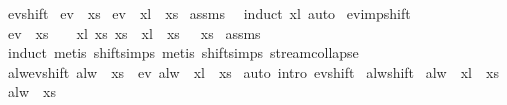 \begin{isabellebody}
\isanewline
{}\isamarkupfalse%
\ ev{\isacharunderscore}shift{\isacharcolon}\isanewline
{}\ {\isachardoublequoteopen}ev\ {\isasymphi}\ xs{\isachardoublequoteclose}\isanewline
{}\ {\isachardoublequoteopen}ev\ {\isasymphi}\ {\isacharparenleft}xl\ {\isacharat}{\isacharminus}\ xs{\isacharparenright}{\isachardoublequoteclose}\isanewline
%
\isadelimproof
%
\endisadelimproof
%
\isatagproof
{}\isamarkupfalse%
\ assms\ \isamarkupfalse%
\ {\isacharparenleft}induct\ xl{\isacharparenright}\ auto%
\endisatagproof
{\isafoldproof}%
%
\isadelimproof
\isanewline
%
\endisadelimproof
\isanewline
{}\isamarkupfalse%
\ ev{\isacharunderscore}imp{\isacharunderscore}shift{\isacharcolon}\isanewline
{}\ {\isachardoublequoteopen}ev\ {\isasymphi}\ xs{\isachardoublequoteclose}\ \ \ {\isachardoublequoteopen}{\isasymexists}\ xl\ xs{}{\isachardot}\ xs\ {\isacharequal}\ xl\ {\isacharat}{\isacharminus}\ xs{}\ {\isasymand}\ {\isasymphi}\ xs{}{\isachardoublequoteclose}\isanewline
%
\isadelimproof
%
\endisadelimproof
%
\isatagproof
{}\isamarkupfalse%
\ assms\ \isamarkupfalse%
\ induct\ {\isacharparenleft}metis\ shift{\isachardot}simps{\isacharparenleft}{}{\isacharparenright}{\isacharcomma}\ metis\ shift{\isachardot}simps{\isacharparenleft}{}{\isacharparenright}\ stream{\isachardot}collapse{\isacharparenright}{\isacharplus}%
\endisatagproof
{\isafoldproof}%
%
\isadelimproof
\isanewline
%
\endisadelimproof
\isanewline
{}\isamarkupfalse%
\ alw{\isacharunderscore}ev{\isacharunderscore}shift{\isacharcolon}\ {\isachardoublequoteopen}alw\ {\isasymphi}\ xs{}\ {\isasymLongrightarrow}\ ev\ {\isacharparenleft}alw\ {\isasymphi}{\isacharparenright}\ {\isacharparenleft}xl\ {\isacharat}{\isacharminus}\ xs{}{\isacharparenright}{\isachardoublequoteclose}\isanewline
%
\isadelimproof
%
\endisadelimproof
%
\isatagproof
{}\isamarkupfalse%
\ {\isacharparenleft}auto\ intro{\isacharcolon}\ ev{\isacharunderscore}shift{\isacharparenright}%
\endisatagproof
{\isafoldproof}%
%
\isadelimproof
\isanewline
%
\endisadelimproof
\isanewline
{}\isamarkupfalse%
\ alw{\isacharunderscore}shift{\isacharcolon}\isanewline
{}\ {\isachardoublequoteopen}alw\ {\isasymphi}\ {\isacharparenleft}xl\ {\isacharat}{\isacharminus}\ xs{\isacharparenright}{\isachardoublequoteclose}\isanewline
{}\ {\isachardoublequoteopen}alw\ {\isasymphi}\ xs{\isachardoublequoteclose}\isanewline

\end{isabellebody}
